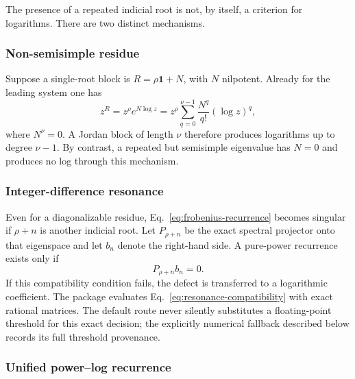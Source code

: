 \documentclass[11pt]{article}
\newcommand{\Id}{\mathbf 1}
\begin{document}
The presence of a repeated indicial root is not, by itself, a criterion for logarithms.
There are two distinct mechanisms.

\subsubsection{Non-semisimple residue}

Suppose a single-root block is $R=\rho\Id+N$, with $N$ nilpotent.  Already for the leading
system one has
\begin{equation}
  z^R=z^\rho e^{N\log z}
  =z^\rho\sum_{q=0}^{\nu-1}\frac{N^q}{q!}(\log z)^q,
  \label{eq:jordan-log}
\end{equation}
where $N^\nu=0$.  A Jordan block of length $\nu$ therefore produces logarithms up to degree
$\nu-1$.  By contrast, a repeated but semisimple eigenvalue has $N=0$ and produces no log
through this mechanism.

\subsubsection{Integer-difference resonance}

Even for a diagonalizable residue, Eq.~\eqref{eq:frobenius-recurrence} becomes singular if
$\rho+n$ is another indicial root.  Let $P_{\rho+n}$ be the exact spectral projector onto
that eigenspace and let $b_n$ denote the right-hand side.  A pure-power recurrence exists
only if
\begin{equation}
  P_{\rho+n}b_n=0.
  \label{eq:resonance-compatibility}
\end{equation}
If this compatibility condition fails, the defect is transferred to a logarithmic
coefficient.  The package evaluates Eq.~\eqref{eq:resonance-compatibility} with exact
rational matrices.  The default route never silently substitutes a floating-point threshold
for this exact decision; the explicitly numerical fallback described below records its full
threshold provenance.

\subsubsection{Unified power--log recurrence}
\end{document}
